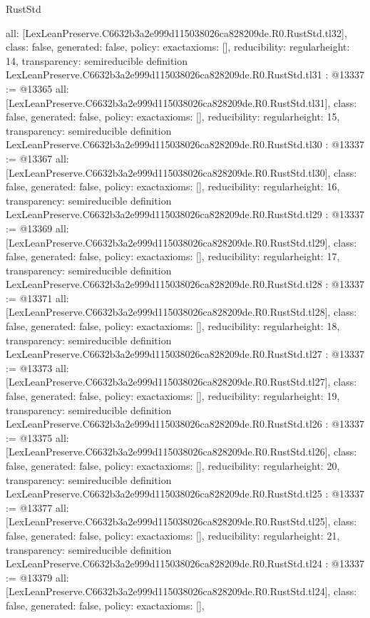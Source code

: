 \begin{lexlean}{RustStd}
\begin{coremodule}
{  all: [LexLeanPreserve.C6632b3a2e999d115038026ca828209de.R0.RustStd.tl32],
  class: false,
  generated: false,
  policy: exact{axioms: []},
  reducibility: regular{height: 14},
  transparency: semireducible
}
definition LexLeanPreserve.C6632b3a2e999d115038026ca828209de.R0.RustStd.tl31 : @13337 := @13365 {
  all: [LexLeanPreserve.C6632b3a2e999d115038026ca828209de.R0.RustStd.tl31],
  class: false,
  generated: false,
  policy: exact{axioms: []},
  reducibility: regular{height: 15},
  transparency: semireducible
}
definition LexLeanPreserve.C6632b3a2e999d115038026ca828209de.R0.RustStd.tl30 : @13337 := @13367 {
  all: [LexLeanPreserve.C6632b3a2e999d115038026ca828209de.R0.RustStd.tl30],
  class: false,
  generated: false,
  policy: exact{axioms: []},
  reducibility: regular{height: 16},
  transparency: semireducible
}
definition LexLeanPreserve.C6632b3a2e999d115038026ca828209de.R0.RustStd.tl29 : @13337 := @13369 {
  all: [LexLeanPreserve.C6632b3a2e999d115038026ca828209de.R0.RustStd.tl29],
  class: false,
  generated: false,
  policy: exact{axioms: []},
  reducibility: regular{height: 17},
  transparency: semireducible
}
definition LexLeanPreserve.C6632b3a2e999d115038026ca828209de.R0.RustStd.tl28 : @13337 := @13371 {
  all: [LexLeanPreserve.C6632b3a2e999d115038026ca828209de.R0.RustStd.tl28],
  class: false,
  generated: false,
  policy: exact{axioms: []},
  reducibility: regular{height: 18},
  transparency: semireducible
}
definition LexLeanPreserve.C6632b3a2e999d115038026ca828209de.R0.RustStd.tl27 : @13337 := @13373 {
  all: [LexLeanPreserve.C6632b3a2e999d115038026ca828209de.R0.RustStd.tl27],
  class: false,
  generated: false,
  policy: exact{axioms: []},
  reducibility: regular{height: 19},
  transparency: semireducible
}
definition LexLeanPreserve.C6632b3a2e999d115038026ca828209de.R0.RustStd.tl26 : @13337 := @13375 {
  all: [LexLeanPreserve.C6632b3a2e999d115038026ca828209de.R0.RustStd.tl26],
  class: false,
  generated: false,
  policy: exact{axioms: []},
  reducibility: regular{height: 20},
  transparency: semireducible
}
definition LexLeanPreserve.C6632b3a2e999d115038026ca828209de.R0.RustStd.tl25 : @13337 := @13377 {
  all: [LexLeanPreserve.C6632b3a2e999d115038026ca828209de.R0.RustStd.tl25],
  class: false,
  generated: false,
  policy: exact{axioms: []},
  reducibility: regular{height: 21},
  transparency: semireducible
}
definition LexLeanPreserve.C6632b3a2e999d115038026ca828209de.R0.RustStd.tl24 : @13337 := @13379 {
  all: [LexLeanPreserve.C6632b3a2e999d115038026ca828209de.R0.RustStd.tl24],
  class: false,
  generated: false,
  policy: exact{axioms: []},
}
\end{coremodule}
\end{lexlean}
